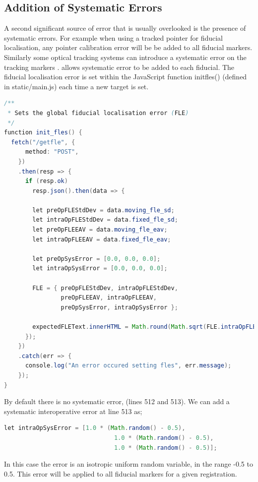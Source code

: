 \subsection{Addition of Systematic Errors}
\label{sec:sys_method}
A second significant source of error that is usually overlooked is the presence of systematic errors. For example when using a tracked pointer for fiducial localisation, 
any pointer calibration error will be be added to all fiducial markers.
Similarly some optical tracking systems can introduce a systematic error on 
the tracking markers \cite{6294449}. \fred allows systematic error to 
be added to each fiducial. The fiducial localisation error is set within 
the JavaScript function init{\textunderscore}fles()
(defined in static/main.js) each time a new target is set. 
\begin{lstlisting}[language=java, firstnumber = 496]
/**
 * Sets the global fiducial localisation error (FLE)
 */
function init_fles() {
  fetch("/getfle", {
      method: "POST",
    })
    .then(resp => {
      if (resp.ok)
        resp.json().then(data => {

        let preOpFLEStdDev = data.moving_fle_sd;
        let intraOpFLEStdDev = data.fixed_fle_sd;
        let preOpFLEEAV = data.moving_fle_eav;
        let intraOpFLEEAV = data.fixed_fle_eav;

        let preOpSysError = [0.0, 0.0, 0.0];
        let intraOpSysError = [0.0, 0.0, 0.0];

        FLE = { preOpFLEStdDev, intraOpFLEStdDev,
                preOpFLEEAV, intraOpFLEEAV,
                preOpSysError, intraOpSysError };

        expectedFLEText.innerHTML = Math.round(Math.sqrt(FLE.intraOpFLEEAV)*100)/100;
      });
    })
    .catch(err => {
      console.log("An error occured setting fles", err.message);
    });
}
\end{lstlisting}
By default there is no systematic error, (lines 512 and 513). We can 
add a systematic interoperative error at line 513 as; 

\begin{lstlisting}[language=java, firstnumber = 513]
        let intraOpSysError = [1.0 * (Math.random() - 0.5), 
                               1.0 * (Math.random() - 0.5), 
                               1.0 * (Math.random() - 0.5)];
\end{lstlisting}

In this case the error is an isotropic uniform random variable, in the range
-0.5 to 0.5. This error will be applied to all fiducial markers for a 
given registration. 


